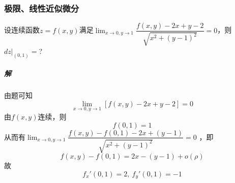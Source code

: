 \subsubsection{极限、线性近似微分}
设连续函数\(z = f(x, y)\)满足\(\displaystyle\lim_{x \to 0, y \to 1}\dfrac{f(x, y) - 2x + y - 2}{\sqrt{x^2 + (y - 1)^2}} = 0\)，则\(dz\bigg|_{(0, 1)} = \)?
\subparagraph{解}
由题可知\[\displaystyle\lim_{x \to 0, y \to 1}[f(x, y) - 2x + y - 2] = 0\]
由\(f(x, y)\)连续，则\[f(0, 1) = 1\]
从而有\(\displaystyle\lim_{x \to 0, y \to 1}\dfrac{f(x, y) - f(0, 1) - 2x + (y - 1)}{\sqrt{x^2 + (y - 1)^2}} = 0\)
，即\[f(x, y) - f(0, 1) = 2x - (y - 1) + o(\rho)\]
故\[f_x'(0, 1) = 2,\ f_y'(0, 1) = -1\]





